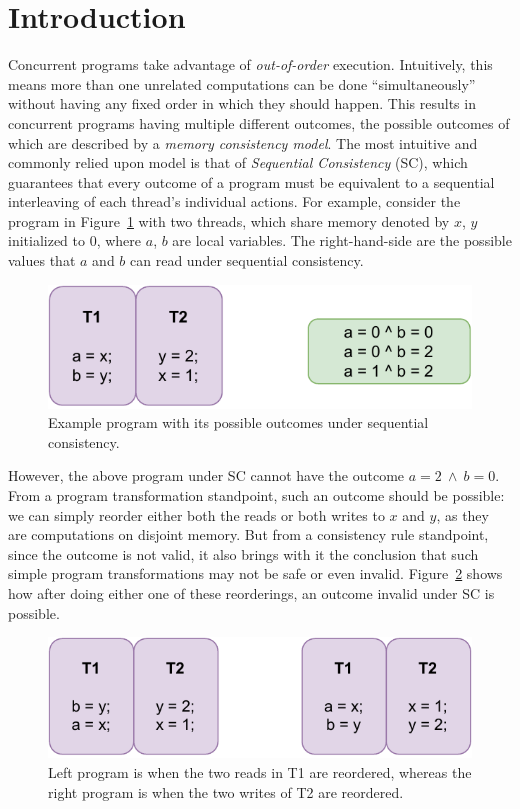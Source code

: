 \section{Introduction} 
    Concurrent programs take advantage of \textit{out-of-order} execution. Intuitively, this means more than one unrelated computations can be done ``simultaneously'' without having any fixed order in which they should happen. 
    This results in concurrent programs having multiple different outcomes, the possible outcomes of which are described by
    a \textit{memory consistency model}. 
    The most intuitive and commonly relied upon model is that of \textit{Sequential Consistency} (SC), which guarantees that every outcome of a program must be equivalent to a sequential interleaving of each thread's individual actions. 
    For example, consider the program in Figure~\ref{intro:Example} with two threads, which share memory denoted by $x$, $y$ initialized to 0, where $a$, $b$ are local variables. The right-hand-side are the possible values that $a$ and $b$ can read under sequential consistency.
    
    \begin{figure}[H]
        \centering
        \includegraphics[scale=0.7]{Program_Example.pdf}
        \caption{Example program with its possible outcomes under sequential consistency.}
        \label{intro:Example}
    \end{figure}
    
    
    However, the above program under SC cannot have the outcome $a=2\ \wedge\ b=0$. 
    From a program transformation standpoint, such an outcome should be possible: we can simply reorder either both the reads or both writes to $x$ and $y$, as they are computations on disjoint memory. 
    But from a consistency rule standpoint, since the outcome is not valid, it also brings with it the conclusion that such simple program transformations may not be safe or even invalid.
    Figure~\ref{intro:Example2} shows how after doing either one of these reorderings, an outcome invalid under SC is possible. 
    \begin{figure}[H]
        \centering
        \includegraphics[scale=0.7]{Program_Transform_Example.pdf}
        \caption{Left program is when the two reads in T1 are reordered, whereas the right program is when the two writes of T2 are reordered.}
        \label{intro:Example2}
    \end{figure}
    
